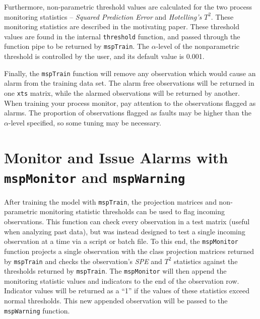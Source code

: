 \documentclass{report}\usepackage[]{graphicx}\usepackage[]{color}
\begin{document}
Furthermore, non-parametric threshold values are calculated for the two process monitoring statistics -- \emph{Squared Prediction Error} and \emph{Hotelling's} $T^2$. These monitoring statistics are described in the motivating paper. These threshold values are found in the internal \texttt{threshold} function, and passed through the function pipe to be returned by \texttt{mspTrain}. The $\alpha$-level of the nonparametric threshold is controlled by the user, and its default value is 0.001.

Finally, the \texttt{mspTrain} function will remove any observation which would cause an alarm from the training data set. The alarm free observations will be returned in one \texttt{xts} matrix, while the alarmed observations will be returned by another. When training your process monitor, pay attention to the observations flagged as alarms. The proportion of observations flagged as faults may be higher than the $\alpha$-level specified, so some tuning may be necessary.




\section{Monitor and Issue Alarms with \texttt{mspMonitor} and \texttt{mspWarning}}

After training the model with \texttt{mspTrain}, the projection matrices and non-parametric monitoring statistic thresholds can be used to flag incoming observations. This function can check every observation in a test matrix (useful when analyzing past data), but was instead designed to test a single incoming observation at a time via a script or batch file. To this end, the \texttt{mspMonitor} function projects a single observation with the class projection matrices returned by \texttt{mspTrain} and checks the observation's \emph{SPE} and $T^2$ statistics against the thresholds returned by \texttt{mspTrain}. The \texttt{mspMonitor} will then append the monitoring statistic values and indicators to the end of the observation row. Indicator values will be returned as a ``1'' if the values of these statistics exceed normal thresholds. This new appended observation will be passed to the \texttt{mspWarning} function.
\end{document}

